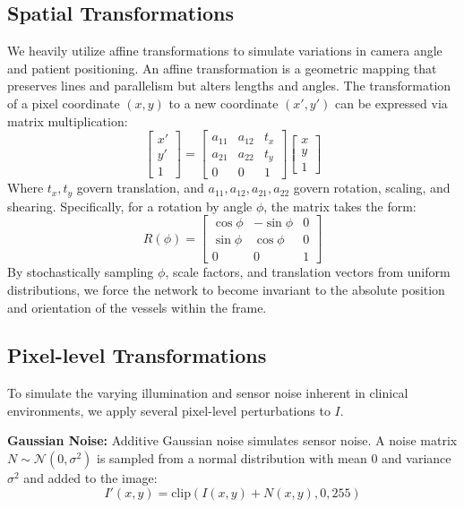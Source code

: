 \subsection{Spatial Transformations}
We heavily utilize affine transformations to simulate variations in camera angle and patient positioning. An affine transformation is a geometric mapping that preserves lines and parallelism but alters lengths and angles. The transformation of a pixel coordinate $(x,y)$ to a new coordinate $(x',y')$ can be expressed via matrix multiplication:
\begin{equation}
    \begin{bmatrix} x' \\ y' \\ 1 \end{bmatrix} = 
    \begin{bmatrix} a_{11} & a_{12} & t_x \\ a_{21} & a_{22} & t_y \\ 0 & 0 & 1 \end{bmatrix}
    \begin{bmatrix} x \\ y \\ 1 \end{bmatrix}
\end{equation}
Where $t_x, t_y$ govern translation, and $a_{11}, a_{12}, a_{21}, a_{22}$ govern rotation, scaling, and shearing. Specifically, for a rotation by angle $\phi$, the matrix takes the form:
\begin{equation}
    R(\phi) = \begin{bmatrix} \cos\phi & -\sin\phi & 0 \\ \sin\phi & \cos\phi & 0 \\ 0 & 0 & 1 \end{bmatrix}
\end{equation}
By stochastically sampling $\phi$, scale factors, and translation vectors from uniform distributions, we force the network to become invariant to the absolute position and orientation of the vessels within the frame.

\subsection{Pixel-level Transformations}
To simulate the varying illumination and sensor noise inherent in clinical environments, we apply several pixel-level perturbations to $I$. 

\textbf{Gaussian Noise:} Additive Gaussian noise simulates sensor noise. A noise matrix $N \sim \mathcal{N}(0, \sigma^2)$ is sampled from a normal distribution with mean 0 and variance $\sigma^2$ and added to the image:
\begin{equation}
    I'(x,y) = \text{clip}(I(x,y) + N(x,y), 0, 255)
\end{equation}

